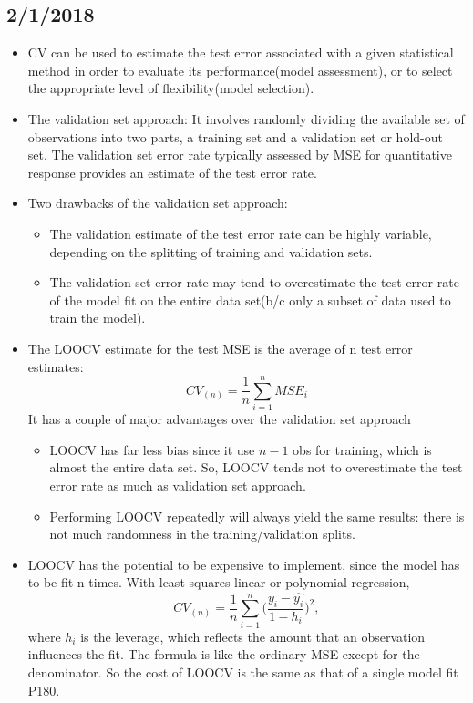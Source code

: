 \documentclass[a4paper, 12pt]{article}
\begin{document}
\subsection{2/1/2018}
\begin{itemize}
	\item CV can be used to estimate the test error associated with a given statistical method in order to evaluate its performance(model assessment), or to select the appropriate level of flexibility(model selection).
	\item The validation set approach: It involves randomly dividing the available set of observations into two parts, a training set and a validation set or hold-out set. The validation set error rate typically assessed by MSE for quantitative response provides an estimate of the test error rate.
	\item Two drawbacks of the validation set approach:
	\begin{itemize}
		\item The validation estimate of the test error rate can be highly variable, depending on the splitting of training and validation sets.
		\item The validation set error rate may tend to overestimate the test error rate of the model fit on the entire data set(b/c only a subset of data used to train the model).
	\end{itemize}
	\item The LOOCV estimate for the test MSE is the average of n test error estimates:
	\[CV_{(n)}=\frac{1}{n}\sum_{i=1}^{n}MSE_i
	\]
	It has a couple of major advantages over the validation set approach
	\begin{itemize}
		\item LOOCV has far less bias since it use $n-1$ obs for training, which is almost the entire data set. So, LOOCV tends not to overestimate the test error rate as much as validation set approach.
		\item Performing LOOCV repeatedly will always yield the same results: there is not much randomness in the training/validation splits.
	\end{itemize}
	\item LOOCV has the potential to be expensive to implement, since the model has to be fit n times. With least squares linear or polynomial regression,
	\[ CV_{(n)}=\frac{1}{n}\sum_{i=1}^{n}\big(\frac{y_i-\hat{y_i}}{1-h_i}\big)^2,
	\]
	where $h_i$ is the leverage, which reflects the amount that an observation influences the fit. The formula is like the ordinary MSE except for the denominator. So the cost of LOOCV is the same as that of a single model fit P180.
	

\end{itemize}
\end{document}
